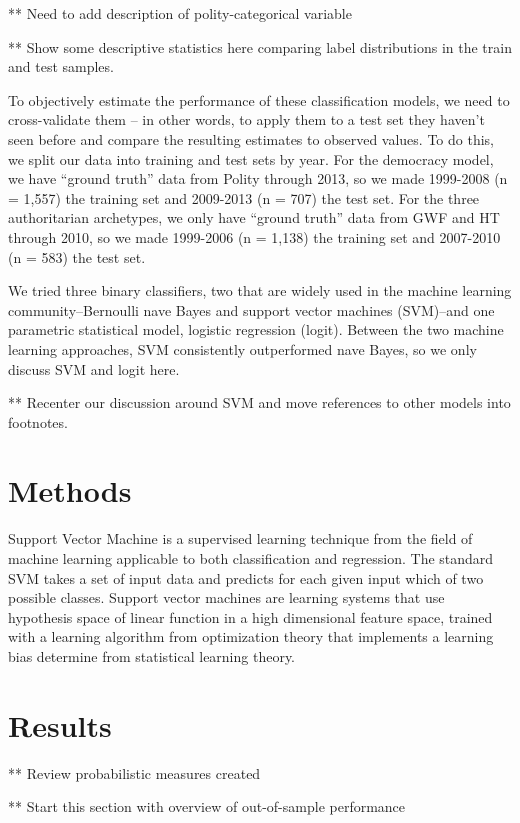 \documentclass[pdftex,12pt,fullpage,oneside]{amsart}
\begin{document}
** Need to add description of polity-categorical variable

** Show some descriptive statistics here comparing label distributions in the train and test samples. 

To objectively estimate the performance of these classification models, we need to cross-validate them -- in other words, to apply them to a test set they haven't seen before and compare the resulting estimates to observed values. To do this, we split our data into training and test sets by year. For the democracy model, we have ``ground truth'' data from Polity through 2013, so we made 1999-2008 (n = 1,557) the training set and 2009-2013 (n = 707) the test set. For the three authoritarian archetypes, we only have ``ground truth'' data from GWF and HT through 2010, so we made 1999-2006 (n = 1,138) the training set and 2007-2010 (n = 583) the test set. 

We tried three binary classifiers, two that are widely used in the machine learning community--Bernoulli nave Bayes and support vector machines (SVM)--and one parametric statistical model, logistic regression (logit). Between the two machine learning approaches, SVM consistently outperformed nave  Bayes, so we only discuss SVM and logit here. 

** Recenter our discussion around SVM and move references to other models into footnotes. 

\section{Methods}

Support Vector Machine is a supervised learning technique from the field of machine learning applicable to both classification and regression. The standard SVM takes a set of input data and predicts for each given input which of two possible classes. Support vector machines are learning systems that use hypothesis space of linear function in a high dimensional feature space, trained with a learning algorithm from optimization theory that implements a learning bias determine from statistical learning theory. 

\section{Results}

** Review probabilistic measures created

** Start this section with overview of out-of-sample performance
\end{document}
